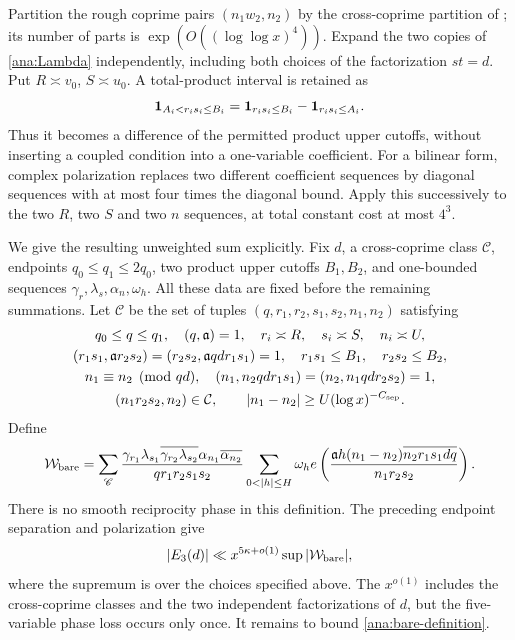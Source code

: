 Partition the rough coprime pairs $(n_1w_2,n_2)$ by the cross-coprime
partition of \cite[Lemma 13.2]{MaynardI}; its number of parts is
$\exp(O((\log\log x)^4))$. Expand the two copies of
\eqref{ana:Lambda} independently, including both choices of the
factorization $st=d$. Put $R\asymp v_0$, $S\asymp u_0$.
A total-product interval is retained as
\[
 \mathbf 1_{A_i<r_is_i\le B_i}
       =\mathbf 1_{r_is_i\le B_i}-\mathbf 1_{r_is_i\le A_i}.
\]
Thus it becomes a difference of the permitted product upper cutoffs,
without inserting a coupled condition into a one-variable coefficient.
For a bilinear form, complex polarization replaces two different
coefficient sequences by diagonal sequences with at most four times
the diagonal bound. Apply this successively to the two $R$, two $S$
and two $n$ sequences, at total constant cost at most $4^3$.

We give the resulting unweighted sum explicitly. Fix $d$, a
cross-coprime class $\mathcal C$, endpoints $q_0\le q_1\le2q_0$,
two product upper cutoffs $B_1,B_2$, and one-bounded sequences
$\gamma_r,\lambda_s,\alpha_n,\omega_h$. All these data are fixed
before the remaining summations. Let $\mathscr C$ be the set of
tuples $(q,r_1,r_2,s_1,s_2,n_1,n_2)$ satisfying
\begin{equation}\label{ana:bare-domain}
\begin{gathered}
 q_0\le q\le q_1,\quad (q,\mathfrak{a})=1,\quad
 r_i\asymp R,\quad s_i\asymp S,\quad n_i\asymp U,\\
 (r_1s_1,\mathfrak{a}r_2s_2)=(r_2s_2,\mathfrak{a}qdr_1s_1)=1,\quad
 r_1s_1\le B_1,\quad r_2s_2\le B_2,\\
 n_1\equiv n_2\pmod{qd},\quad
 (n_1,n_2qdr_1s_1)=(n_2,n_1qdr_2s_2)=1,\\
 (n_1r_2s_2,n_2)\in\mathcal C,\qquad
 |n_1-n_2|\ge U(\log x)^{-C_{\rm sep}}.
\end{gathered}
\end{equation}
Define
\begin{equation}\label{ana:bare-definition}
\mathcal W_{\rm bare}=
 \sum_{\mathscr C}
 \frac{\gamma_{r_1}\lambda_{s_1}
           \overline{\gamma_{r_2}\lambda_{s_2}}
           \alpha_{n_1}\overline{\alpha_{n_2}}}
      {q r_1r_2s_1s_2}
 \sum_{0<|h|\le H}\omega_h
 e\left(\frac{\mathfrak{a}h(n_1-n_2)\overline{n_2r_1s_1dq}}
               {n_1r_2s_2}\right).
\end{equation}
There is no smooth reciprocity phase in this definition.
The preceding endpoint separation and polarization give
\begin{equation}\label{ana:E3-bare-reduction}
 |E_3(d)|\ll x^{5\kappa+o(1)}
       \sup|\mathcal W_{\rm bare}|,
\end{equation}
where the supremum is over the choices specified above. The
$x^{o(1)}$ includes the cross-coprime classes and the two independent
factorizations of $d$, but the five-variable phase loss occurs only
once. It remains to bound \eqref{ana:bare-definition}.

